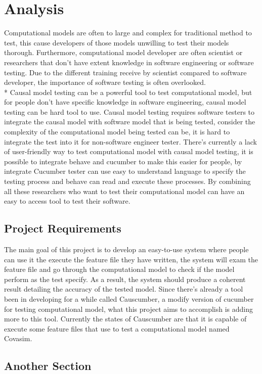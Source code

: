 \chapter{Analysis}
Computational models are often to large and complex for traditional method to test, this cause developers of those models unwilling to test their models thorough. Furthermore, computational model developer are often scientist or researchers that don’t have extent knowledge in software engineering or software testing. Due to the different training receive by scientist compared to software developer, the importance of software testing is often overlooked.  \\*
Causal model testing can be a powerful tool to test computational model, but for people don’t have specific knowledge in software engineering, causal model testing can be hard tool to use. Causal model testing requires software testers to integrate the causal model with software model that is being tested, consider the complexity of the computational model being tested can be, it is hard to integrate the test into it for non-software engineer tester. There’s currently a lack of user-friendly way to test computational model with causal model testing, it is possible to integrate behave and cucumber to make this easier for people, by integrate Cucumber tester can use easy to understand language to specify the testing process and behave can read and execute these processes. By combining all these researchers who want to test their computational model can have an easy to access tool to test their software.
\section{Project Requirements}

The main goal of this project is to develop an easy-to-use system where people can use it the execute the feature file they have written, the system will exam the feature file and go through the computational model to check if the model perform as the test specify. As a result, the system should produce a coherent result detailing the accuracy of the tested model. Since there’s already a tool been in developing for a while called Causcumber, a modify version of cucumber for testing computational model, what this project aims to accomplish is adding more to this tool. Currently the states of Causcumber are that it is capable of execute some feature files that use to test a computational model named Covasim.

\section{Another Section}

